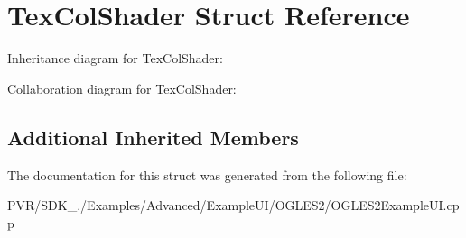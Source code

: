 \hypertarget{struct_tex_col_shader}{\section{Tex\+Col\+Shader Struct Reference}
\label{struct_tex_col_shader}
}


Inheritance diagram for Tex\+Col\+Shader\+:


Collaboration diagram for Tex\+Col\+Shader\+:
\subsection*{Additional Inherited Members}


The documentation for this struct was generated from the following file\+:\begin{DoxyCompactItemize}
\item 
P\+V\+R/\+S\+D\+K\+\_./\+Examples/\+Advanced/\+Example\+U\+I/\+O\+G\+L\+E\+S2/O\+G\+L\+E\+S2\+Example\+U\+I.\+cpp\end{DoxyCompactItemize}
